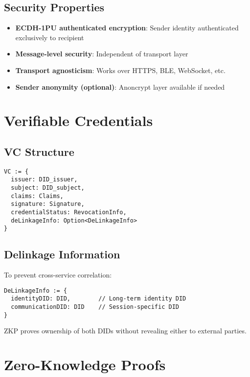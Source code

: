 \subsection{Security Properties}

\begin{itemize}
  \item \textbf{ECDH-1PU authenticated encryption}: Sender identity authenticated exclusively to recipient
  \item \textbf{Message-level security}: Independent of transport layer
  \item \textbf{Transport agnosticism}: Works over HTTPS, BLE, WebSocket, etc.
  \item \textbf{Sender anonymity (optional)}: Anoncrypt layer available if needed
\end{itemize}

\section{Verifiable Credentials}

\subsection{VC Structure}

\begin{verbatim}
VC := {
  issuer: DID_issuer,
  subject: DID_subject,
  claims: Claims,
  signature: Signature,
  credentialStatus: RevocationInfo,
  deLinkageInfo: Option<DeLinkageInfo>
}
\end{verbatim}

\subsection{Delinkage Information}

To prevent cross-service correlation:

\begin{verbatim}
DeLinkageInfo := {
  identityDID: DID,        // Long-term identity DID
  communicationDID: DID    // Session-specific DID
}
\end{verbatim}

ZKP proves ownership of both DIDs without revealing either to external parties.

\section{Zero-Knowledge Proofs}

